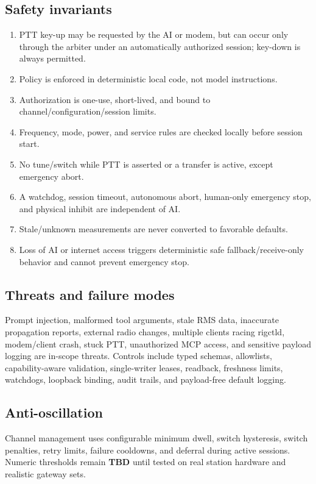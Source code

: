 \documentclass[11pt,a4paper]{article}
\newcommand{\todo}{\textcolor{ovred}{\textbf{TBD}}}
\begin{document}
\subsection{Safety invariants}
\begin{enumerate}
  \item PTT key-up may be requested by the AI or modem, but can occur only through the arbiter under an automatically authorized session; key-down is always permitted.
  \item Policy is enforced in deterministic local code, not model instructions.
  \item Authorization is one-use, short-lived, and bound to channel/configuration/session limits.
  \item Frequency, mode, power, and service rules are checked locally before session start.
  \item No tune/switch while PTT is asserted or a transfer is active, except emergency abort.
  \item A watchdog, session timeout, autonomous abort, human-only emergency stop, and physical inhibit are independent of AI.
  \item Stale/unknown measurements are never converted to favorable defaults.
  \item Loss of AI or internet access triggers deterministic safe fallback/receive-only behavior and cannot prevent emergency stop.
\end{enumerate}

\subsection{Threats and failure modes}
Prompt injection, malformed tool arguments, stale RMS data, inaccurate propagation reports, external radio changes, multiple clients racing rigctld, modem/client crash, stuck PTT, unauthorized MCP access, and sensitive payload logging are in-scope threats. Controls include typed schemas, allowlists, capability-aware validation, single-writer leases, readback, freshness limits, watchdogs, loopback binding, audit trails, and payload-free default logging.

\subsection{Anti-oscillation}
Channel management uses configurable minimum dwell, switch hysteresis, switch penalties, retry limits, failure cooldowns, and deferral during active sessions. Numeric thresholds remain \todo{} until tested on real station hardware and realistic gateway sets.
\end{document}
